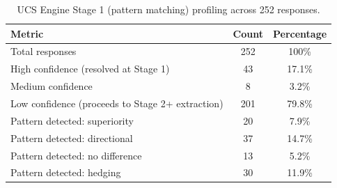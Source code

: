 \documentclass[manuscript, review, anonymous]{acmart}
\begin{document}
\begin{table}[ht]
\centering
\caption{UCS Engine Stage 1 (pattern matching) profiling across 252 responses.}
\label{tab:app_stage1}
\begin{tabular}{lcc}
\toprule
\textbf{Metric} & \textbf{Count} & \textbf{Percentage} \\
\midrule
Total responses & 252 & 100\% \\
\midrule
High confidence (resolved at Stage 1) & 43 & 17.1\% \\
Medium confidence & 8 & 3.2\% \\
Low confidence (proceeds to Stage 2+ extraction) & 201 & 79.8\% \\
\midrule
Pattern detected: superiority & 20 & 7.9\% \\
Pattern detected: directional & 37 & 14.7\% \\
Pattern detected: no difference & 13 & 5.2\% \\
Pattern detected: hedging & 30 & 11.9\% \\
\bottomrule
\end{tabular}
\end{table}
\end{document}
